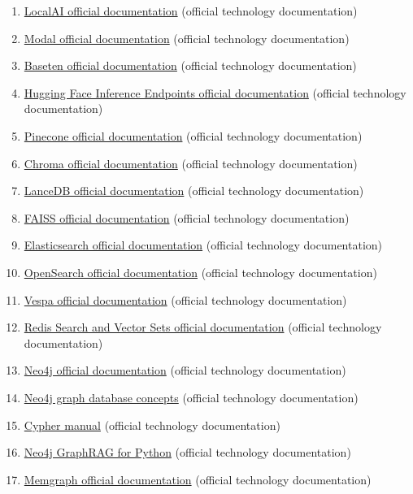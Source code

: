 \begin{enumerate}
\item \href{https://localai.io/}{LocalAI official documentation} (official technology documentation)
\item \href{https://modal.com/docs/guide}{Modal official documentation} (official technology documentation)
\item \href{https://docs.baseten.co/}{Baseten official documentation} (official technology documentation)
\item \href{https://huggingface.co/docs/inference-endpoints/index}{Hugging Face Inference Endpoints official documentation} (official technology documentation)
\item \href{https://docs.pinecone.io/}{Pinecone official documentation} (official technology documentation)
\item \href{https://docs.trychroma.com/}{Chroma official documentation} (official technology documentation)
\item \href{https://docs.lancedb.com/}{LanceDB official documentation} (official technology documentation)
\item \href{https://github.com/facebookresearch/faiss}{FAISS official documentation} (official technology documentation)
\item \href{https://www.elastic.co/docs/solutions/search}{Elasticsearch official documentation} (official technology documentation)
\item \href{https://docs.opensearch.org/latest/vector-search/}{OpenSearch official documentation} (official technology documentation)
\item \href{https://docs.vespa.ai/}{Vespa official documentation} (official technology documentation)
\item \href{https://redis.io/docs/latest/develop/ai/}{Redis Search and Vector Sets official documentation} (official technology documentation)
\item \href{https://neo4j.com/docs/}{Neo4j official documentation} (official technology documentation)
\item \href{https://neo4j.com/docs/getting-started/appendix/graphdb-concepts/}{Neo4j graph database concepts} (official technology documentation)
\item \href{https://neo4j.com/docs/cypher-manual/current/}{Cypher manual} (official technology documentation)
\item \href{https://neo4j.com/docs/neo4j-graphrag-python/current/}{Neo4j GraphRAG for Python} (official technology documentation)
\item \href{https://memgraph.com/docs}{Memgraph official documentation} (official technology documentation)

\end{enumerate}
